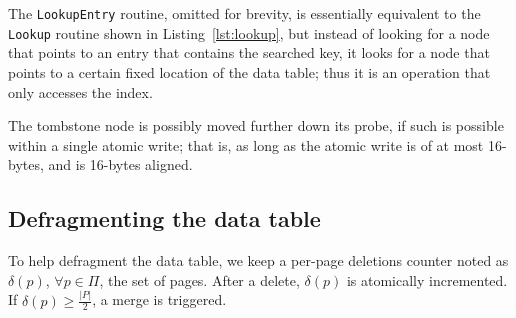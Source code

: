 The \texttt{LookupEntry} routine, omitted for brevity, is essentially equivalent to the \texttt{Lookup} routine shown in Listing~\ref{lst:lookup}, but instead of looking for a node that points to an entry that contains the searched key, it looks for a node that points to a certain fixed location of the data table; thus it is an operation that only accesses the index.

The tombstone node is possibly moved further down its probe, if such is possible within a single atomic write; that is, as long as the atomic write is of at most 16-bytes, and is 16-bytes aligned.

\subsection{Defragmenting the data table}\label{subsec:defragmenting}

To help defragment the data table, we keep a per-page deletions counter noted as $\delta(p)$, $\forall p \in \Pi$, the set of pages.
After a delete, $\delta(p)$ is atomically incremented.
If $\delta(p) \geq \frac{|P|}{2}$, a merge is triggered.

